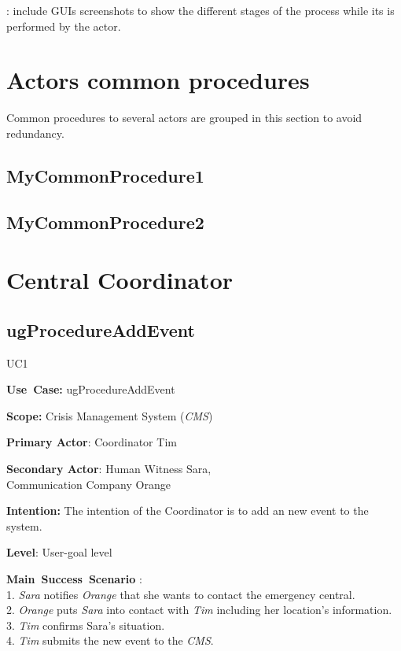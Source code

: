 : include GUIs screenshots to show the
different stages of the process while its is performed by the actor.



\section{Actors common procedures}
Common procedures to several actors are grouped in this section to avoid
redundancy.

\subsection{MyCommonProcedure1}

\subsection{MyCommonProcedure2}


\section{Central Coordinator}

\subsection{ugProcedureAddEvent}
\begin{lyxlist}{UC1}
\small{
\item [\textbf{Use~Case:}] ugProcedureAddEvent
\item [\textbf{Scope:}] Crisis Management System (\emph{CMS})
\item [\textbf{Primary Actor}:] Coordinator Tim
\item [\textbf{Secondary Actor}:] Human Witness Sara,\\
                  Communication Company Orange
\item [\textbf{Intention:}]The intention of the Coordinator is to add an new
event to the system.
\item [\textbf{Level}:]User-goal level
\item [\textbf{Main~Success~Scenario}]:\\
1. \emph{Sara} notifies \emph{Orange} that she wants to contact the emergency
central.\\
2. \emph{Orange} puts \emph{Sara} into contact with \emph{Tim} including her
location's information.\\
3. \emph{Tim} confirms \emph{}{Sara}'s situation.\\
4. \emph{Tim} submits the new event to the \emph{CMS}.\\
}
\end{lyxlist}

